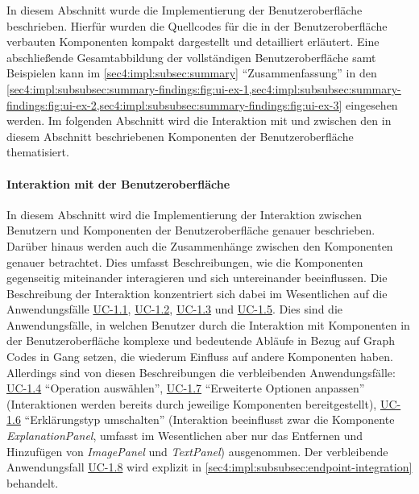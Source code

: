 In diesem Abschnitt wurde die Implementierung der Benutzeroberfläche beschrieben.
Hierfür wurden die Quellcodes für die in der Benutzeroberfläche verbauten Komponenten kompakt dargestellt und detailliert erläutert.
Eine abschließende Gesamtabbildung der vollständigen Benutzeroberfläche samt Beispielen kann im \cref{sec4:impl:subsec:summary} \enquote{Zusammenfassung} in den \cref{sec4:impl:subsubsec:summary-findings:fig:ui-ex-1,sec4:impl:subsubsec:summary-findings:fig:ui-ex-2,sec4:impl:subsubsec:summary-findings:fig:ui-ex-3} eingesehen werden.
Im folgenden Abschnitt wird die Interaktion mit und zwischen den in diesem Abschnitt beschriebenen Komponenten der Benutzeroberfläche thematisiert.

\FloatBarrier

\paragraph{Interaktion mit der Benutzeroberfläche}
\label{sec4:impl:par:ui-interaction}
In diesem Abschnitt wird die Implementierung der Interaktion zwischen Benutzern und Komponenten der Benutzeroberfläche genauer beschrieben.
Darüber hinaus werden auch die Zusammenhänge zwischen den Komponenten genauer betrachtet.
Dies umfasst Beschreibungen, wie die Komponenten gegenseitig miteinander interagieren und sich untereinander beeinflussen.
Die Beschreibung der Interaktion konzentriert sich dabei im Wesentlichen auf die Anwendungsfälle \hyperref[sec3:model:uc-1.1]{UC-1.1}, \hyperref[sec3:model:uc-1.2]{UC-1.2}, \hyperref[sec3:model:uc-1.3]{UC-1.3} und \hyperref[sec3:model:uc-1.5]{UC-1.5}.
Dies sind die Anwendungsfälle, in welchen Benutzer durch die Interaktion mit Komponenten in der Benutzeroberfläche komplexe und bedeutende Abläufe in Bezug auf Graph Codes in Gang setzen, die wiederum Einfluss auf andere Komponenten haben.
Allerdings sind von diesen Beschreibungen die verbleibenden Anwendungsfälle: \hyperref[sec3:model:uc-1.4]{UC-1.4} \enquote{Operation auswählen}, \hyperref[sec3:model:uc-1.7]{UC-1.7} \enquote{Erweiterte Optionen anpassen} (Interaktionen werden bereits durch jeweilige Komponenten bereitgestellt), \hyperref[sec3:model:uc-1.6]{UC-1.6} \enquote{Erklärungstyp umschalten} (Interaktion beeinflusst zwar die Komponente \textit{ExplanationPanel}, umfasst im Wesentlichen aber nur das Entfernen und Hinzufügen von \textit{ImagePanel} und \textit{TextPanel}) ausgenommen.
Der verbleibende Anwendungsfall \hyperref[sec3:model:uc-1.8]{UC-1.8} wird explizit in \cref{sec4:impl:subsubsec:endpoint-integration} behandelt.

